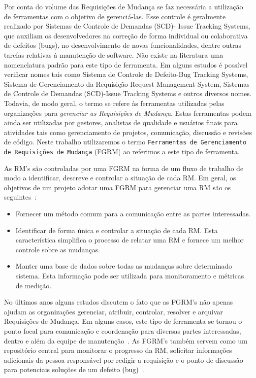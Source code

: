 Por conta do volume das Requisições de Mudança se faz necessária a utilização de
ferramentas com o objetivo de gerenciá-las. Esse controle é geralmente realizado
por Sistemas de Controle de Demandas (SCD)- Issue Tracking Systems, que auxiliam
os desenvolvedores na correção de forma individual ou colaborativa de defeitos
(bugs), no desenvolvimento de novas funcionalidades, dentre outras tarefas
relativas à manutenção de software. Não existe na literatura uma nomenclatura
padrão para este tipo de ferramenta. Em alguns estudos é possível verificar
nomes tais como Sistema de Controle de Defeito\@-\@ Bug Tracking Systems,
Sistema de Gerenciamento da Requisição\@-\@ Request Management System, Sistemas
de Controle de Demandas (SCD)\@-\@ Issue Tracking Systems e outros diversos
nomes.  Todavia, de modo geral, o termo se refere às ferramentas utilizadas
pelas organizações para \textit{gerenciar as Requisições de Mudança}. Estas
ferramentas podem ainda ser utilizadas por gestores, analistas de qualidade e
usuários finais para atividades tais como gerenciamento de projetos,
comunicação, discussão e revisões de código. Neste trabalho utilizaremos o termo
\texttt{Ferramentas de Gerenciamento de Requisições de Mudança} (FGRM) ao
referimos a este tipo de ferramenta.

As RM's são controladas por uma FGRM na forma de um fluxo de trabalho de modo a
identificar, descreve e controlar a situação de cada RM. Em geral, os objetivos
de um projeto adotar uma FGRM para gerenciar uma RM são os
seguintes~\cite{tripathy2014software}:

\begin{itemize}
	\item Fornecer um método comum para a comunicação entre as partes
		interessadas.
	\item Identificar de forma única e controlar a situação de cada RM. Esta
		característica simplifica o processo de relatar uma RM e fornece um
		melhor controle sobre as mudanças.
	\item Manter uma base de dados sobre todas as mudanças sobre determinado
		sistema. Esta informação pode ser utilizada para monitoramento e
		métricas de medição.
\end{itemize}

No últimos anos alguns estudos discutem o fato que as FGRM's não apenas ajudam
as organizações gerenciar, atribuir, controlar, resolver e arquivar Requisições
de Mudança. Em alguns casos, este tipo de ferramenta se tornou o ponto focal
para comunicação e coordenação para diversas partes interessadas, dentro e além
da equipe de manutenção~\cite{Bertram:2010:CCB:1718918.1718972}.  As FGRM's
também servem como um repositório central para monitorar o progresso da RM,
solicitar informações adicionais da pessoa responsável por redigir a requisição
e o ponto de discussão para potenciais soluções de um defeito
(bug)~\cite{zimmermann2009improving}.

